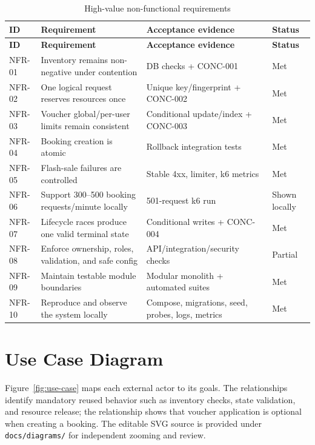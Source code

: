\begingroup
\setlength{\tabcolsep}{3pt}
\scriptsize
\begin{longtable}{p{}p{}p{}p{}}
\caption{High-value non-functional requirements}\label{tab:non-functional-requirements}\\
\toprule
\textbf{ID} & \textbf{Requirement} & \textbf{Acceptance evidence} & \textbf{Status} \\
\midrule
\endfirsthead
\toprule
\textbf{ID} & \textbf{Requirement} & \textbf{Acceptance evidence} & \textbf{Status} \\
\midrule
\endhead
NFR-01 & Inventory remains non-negative under contention & DB checks + CONC-001 & Met \\
NFR-02 & One logical request reserves resources once & Unique key/fingerprint + CONC-002 & Met \\
NFR-03 & Voucher global/per-user limits remain consistent & Conditional update/index + CONC-003 & Met \\
NFR-04 & Booking creation is atomic & Rollback integration tests & Met \\
NFR-05 & Flash-sale failures are controlled & Stable 4xx, limiter, k6 metrics & Met \\
NFR-06 & Support 300--500 booking requests/minute locally & 501-request k6 run & Shown locally \\
NFR-07 & Lifecycle races produce one valid terminal state & Conditional writes + CONC-004 & Met \\
NFR-08 & Enforce ownership, roles, validation, and safe config & API/integration/security checks & Partial \\
NFR-09 & Maintain testable module boundaries & Modular monolith + automated suites & Met \\
NFR-10 & Reproduce and observe the system locally & Compose, migrations, seed, probes, logs, metrics & Met \\
\bottomrule
\end{longtable}
\endgroup

\section{Use Case Diagram}
Figure~\ref{fig:use-case} maps each external actor to its goals. The
 relationships identify mandatory reused behavior such as
inventory checks, state validation, and resource release; the
 relationship shows that voucher application is optional when
creating a booking. The editable SVG source is provided under
\nolinkurl{docs/diagrams/} for independent zooming and review.

